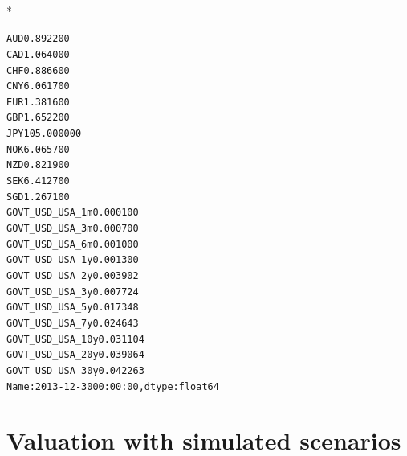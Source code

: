 \documentclass[letterpaper,10pt,english]{/anaconda/lib/python2.7/site-packages/sphinx/texinputs/sphinxhowto}
\def\smaller{\fontsize{9.5pt}{9.5pt}\selectfont}
\newenvironment{InvisibleVerbatim}
        {\begin{mdframed}[leftmargin=0.1\linewidth,innerleftmargin=3pt,innerrightmargin=3pt, userdefinedwidth=1\linewidth, linewidth=0pt, linecolor=white, usetwoside=false]}
        {\end{mdframed}}
\begin{document}
                \makebox[0.1\linewidth]{\smaller\hfill\tt\color{nbframe-out-prompt}Out\hspace{4pt}{[}29{]}:\hspace{4pt}}\\*
                \vspace{-2.55\baselineskip}\begin{InvisibleVerbatim}
                \vspace{-0.5\baselineskip}
\begin{alltt}AUD                   0.892200
CAD                   1.064000
CHF                   0.886600
CNY                   6.061700
EUR                   1.381600
GBP                   1.652200
JPY                 105.000000
NOK                   6.065700
NZD                   0.821900
SEK                   6.412700
SGD                   1.267100
GOVT\_USD\_USA\_1m       0.000100
GOVT\_USD\_USA\_3m       0.000700
GOVT\_USD\_USA\_6m       0.001000
GOVT\_USD\_USA\_1y       0.001300
GOVT\_USD\_USA\_2y       0.003902
GOVT\_USD\_USA\_3y       0.007724
GOVT\_USD\_USA\_5y       0.017348
GOVT\_USD\_USA\_7y       0.024643
GOVT\_USD\_USA\_10y      0.031104
GOVT\_USD\_USA\_20y      0.039064
GOVT\_USD\_USA\_30y      0.042263
Name: 2013-12-30 00:00:00, dtype: float64\end{alltt}

            \end{InvisibleVerbatim}
            
        
    
\section{Valuation with simulated scenarios}

\end{document}
